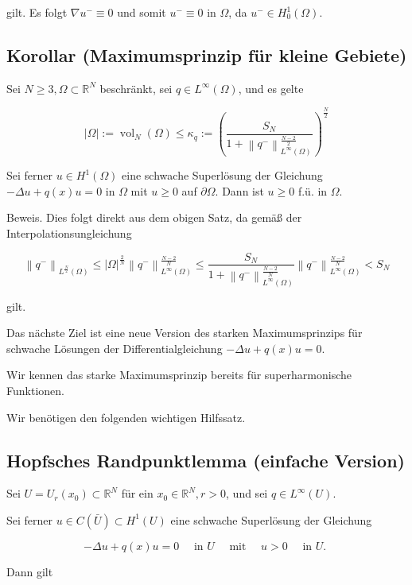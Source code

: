 \documentclass[10pt, letterpaper]{article}
\begin{document}
gilt. Es folgt $\nabla u^{-} \equiv 0$ und somit $u^{-} \equiv 0$ in $\Omega$, da $u^{-} \in H_{0}^{1}(\Omega)$.

\subsection*{Korollar (Maximumsprinzip für kleine Gebiete)}

Sei $N \geq 3, \Omega \subset \mathbb{R}^{N}$ beschränkt, sei $q \in L^{\infty}(\Omega)$, und es gelte

$$
|\Omega|:=\operatorname{vol}_{N}(\Omega) \leq \kappa_{q}:=\left(\frac{S_{N}}{1+\left\|q^{-}\right\|_{L^{\infty}(\Omega)}^{\frac{N-2}{2}}}\right)^{\frac{N}{2}}
$$

Sei ferner $u \in H^{1}(\Omega)$ eine schwache Superlösung der Gleichung $-\Delta u+q(x) u=0$ in $\Omega$ mit $u \geq 0$ auf $\partial \Omega$. Dann ist $u \geq 0$ f.ü. in $\Omega$.

Beweis. Dies folgt direkt aus dem obigen Satz, da gemäß der Interpolationsungleichung

$$
\left\|q^{-}\right\|_{L^{\frac{N}{2}}(\Omega)} \leq|\Omega|^{\frac{2}{N}}\left\|q^{-}\right\|_{L^{\infty}(\Omega)}^{\frac{N-2}{N}} \leq \frac{S_{N}}{1+\left\|q^{-}\right\|_{L^{\infty}(\Omega)}^{\frac{N-2}{N}}}\left\|q^{-}\right\|_{L^{\infty}(\Omega)}^{\frac{N-2}{N}}<S_{N}
$$

gilt.

Das nächste Ziel ist eine neue Version des starken Maximumsprinzips für schwache Lösungen der Differentialgleichung $-\Delta u+q(x) u=0$.

Wir kennen das starke Maximumsprinzip bereits für superharmonische Funktionen.

Wir benötigen den folgenden wichtigen Hilfssatz.

\subsection*{Hopfsches Randpunktlemma (einfache Version)}

Sei $U=U_{r}\left(x_{0}\right) \subset \mathbb{R}^{N}$ für ein $x_{0} \in \mathbb{R}^{N}, r>0$, und sei $q \in L^{\infty}(U)$.

Sei ferner $u \in C(\bar{U}) \subset H^{1}(U)$ eine schwache Superlösung der Gleichung

$$
-\Delta u+q(x) u=0 \quad \text { in } U \quad \text { mit } \quad u>0 \quad \text { in } U \text {. }
$$

Dann gilt
\end{document}

